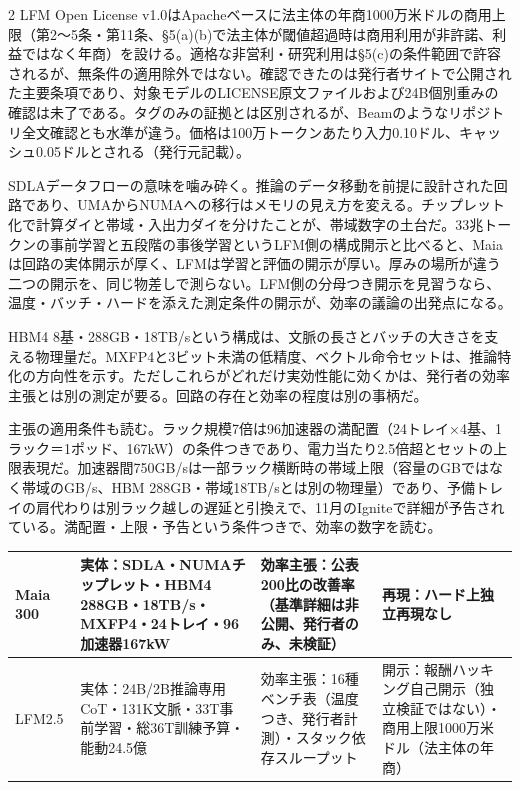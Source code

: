 \documentclass[lualatex,a4paper,10pt]{jlreq}
\begin{document}
\begin{multicols}{2}
LFM Open License v1.0はApacheベースに法主体の年商1000万米ドルの商用上限（第2〜5条・第11条、§5(a)(b)で法主体が閾値超過時は商用利用が非許諾、利益ではなく年商）を設ける。適格な非営利・研究利用は§5(c)の条件範囲で許容されるが、無条件の適用除外ではない。確認できたのは発行者サイトで公開された主要条項であり、対象モデルのLICENSE原文ファイルおよび24B個別重みの確認は未了である。タグのみの証拠とは区別されるが、Beamのようなリポジトリ全文確認とも水準が違う。価格は100万トークンあたり入力0.10ドル、キャッシュ0.05ドルとされる（発行元記載）。
\cite{B11,B69,B12}


SDLAデータフローの意味を噛み砕く。推論のデータ移動を前提に設計された回路であり、UMAからNUMAへの移行はメモリの見え方を変える。チップレット化で計算ダイと帯域・入出力ダイを分けたことが、帯域数字の土台だ。33兆トークンの事前学習と五段階の事後学習というLFM側の構成開示と比べると、Maiaは回路の実体開示が厚く、LFMは学習と評価の開示が厚い。厚みの場所が違う二つの開示を、同じ物差しで測らない。LFM側の分母つき開示を見習うなら、温度・バッチ・ハードを添えた測定条件の開示が、効率の議論の出発点になる。
\cite{B09,B66,B10,B67,B68,B11,B69,B12}


HBM4 8基・288GB・18TB/sという構成は、文脈の長さとバッチの大きさを支える物理量だ。MXFP4と3ビット未満の低精度、ベクトル命令セットは、推論特化の方向性を示す。ただしこれらがどれだけ実効性能に効くかは、発行者の効率主張とは別の測定が要る。回路の存在と効率の程度は別の事柄だ。
\cite{B09,B66,B10,B67,B68}


主張の適用条件も読む。ラック規模7倍は96加速器の満配置（24トレイ×4基、1ラック＝1ポッド、167kW）の条件つきであり、電力当たり2.5倍超とセットの上限表現だ。加速器間750GB/sは一部ラック横断時の帯域上限（容量のGBではなく帯域のGB/s、HBM 288GB・帯域18TB/sとは別の物理量）であり、予備トレイの肩代わりは別ラック越しの遅延と引換えで、11月のIgniteで詳細が予告されている。満配置・上限・予告という条件つきで、効率の数字を読む。
\cite{B09,B66,B10,B67,B68}


\end{multicols} %

{\centering\footnotesize
{}
\begin{tabularx}{0.96\linewidth}{@{}lXXX@{}}
\toprule
Maia 300 & 実体：SDLA・NUMAチップレット・HBM4 288GB・18TB/s・MXFP4・24トレイ・96加速器167kW & 効率主張：公表200比の改善率（基準詳細は非公開、発行者のみ、未検証） & 再現：ハード上独立再現なし \cite{B09,B66,B10,B67} \\
\midrule
LFM2.5 & 実体：24B/2B推論専用CoT・131K文脈・33T事前学習・総36T訓練予算・能動24.5億 & 効率主張：16種ベンチ表（温度つき、発行者計測）・スタック依存スループット & 開示：報酬ハッキング自己開示（独立検証ではない）・商用上限1000万米ドル（法主体の年商） \cite{B11,B69,B12} \\
\bottomrule
\end{tabularx}
} %
\end{document}
